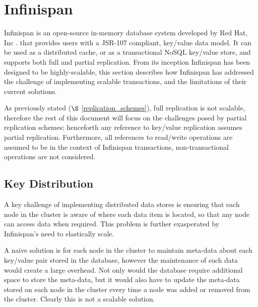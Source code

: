 
\section{Infinispan}\label{sec:infinispan}
Infinispan \citep{Infinispan} is an open-source in-memory database system developed by Red Hat, Inc \citep{RedHat}. that provides users with a JSR-107 \citep{JSR-107} compliant, key/value data model.  It can be used as a distributed cache, or as a transactional NoSQL key/value store, and supports both full and partial replication.  From its inception Infinispan has been designed  to be highly-scalable, this section describes how Infinispan has addressed the challenge of implementing scalable transactions, and the limitations of their current solutions.  

As previously stated ($\S$ \ref{replication_schemes}), full replication is not scalable, therefore the rest of this document will focus on the challenges posed by partial replication schemes; henceforth any reference to key/value replication assumes partial replication.  Furthermore, all references to read/write operations are assumed to be in the context of Infinispan transactions, non-transactional operations are not considered.  

    \subsection{Key Distribution}
    A key challenge of implementing distributed data stores is ensuring that each node in the cluster is aware of where each data item is located, so that any node can access data when required.  This problem is further exasperated by Infinispan's need to elastically scale.  
    
    A naive solution is for each node in the cluster to maintain meta-data about each key/value pair stored in the database, however the maintenance of such data would create a large overhead.  Not only would the database require additional space to store the meta-data, but it would also have to update the meta-data stored on each node in the cluster every time a node was added or removed from the cluster.  Clearly this is not a scalable solution.  
    
